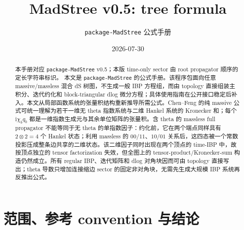 \documentclass[11pt,a4paper]{ctexart}
\title{MadStree v0.5: tree formula}
\author{\texttt{package-MadStree} 公式手册}
\date{2026-07-30}
\newcommand{\ii}{\mathrm i}
\begin{document}
\maketitle

\begin{abstract}
本手册对应 \texttt{package-MadStree} v0.5；本版 time-only sector 由 root propagator 顺序的定长字符串标识。
本文是 \texttt{package-MadStree} 的公式手册。该程序包面向任意 massive/massless 混合 dS 树图，不生成一般 IBP 方程组，而由 topology 直接组装主积分、迭代约化和 block-triangular dlog 微分方程；具体使用指南在公开接口稳定后补入。本文从局部函数系统的张量积结构重新推导所需公式。Chen--Feng 的纯 massive 公式可统一理解为若干一维无 theta 指数系统与二维 Hankel 系统的 Kronecker 和；每个 $\ii\chi_bq_b$ 都是一维指数生成元与其余单位矩阵的张量积。含 theta 的 massless full propagator 不能等同于无 theta 的单指数因子：约化前，它在两个端点同样具有 $2\otimes2=4$ 个 Hankel 状态；利用 massless 的 $00/11$、$10/01$ 关系后，这四态被一个常数投影压成整条边共享的二维状态。该二维因子同时出现在两个顶点的 time-IBP 中，故按顶点独立的 tensor factorization 失效，但全图上的 tensor-product/Kronecker-sum 构造仍然成立。所有 regular IBP、迭代矩阵和 dlog 对角块因而可由 topology 直接写出；theta 导数只增加连接缩边 sector 的固定非对角块，无需先生成大规模 IBP 系统再反推出公式。
\end{abstract}

\tableofcontents

\section{范围、参考 convention 与结论}
\end{document}
